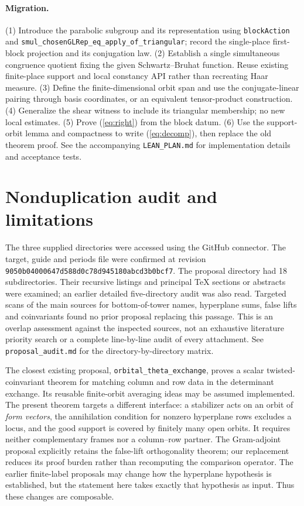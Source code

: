 \documentclass[11pt,letterpaper]{article}
\begin{document}
\paragraph{Migration.} (1) Introduce the parabolic subgroup and its representation using \texttt{blockAction} and \texttt{smul\_chosenGLRep\_eq\_apply\_of\_triangular}; record the single-place first-block projection and its conjugation law. (2) Establish a single simultaneous congruence quotient fixing the given Schwartz--Bruhat function. Reuse existing finite-place support and local constancy API rather than recreating Haar measure. (3) Define the finite-dimensional orbit span and use the conjugate-linear pairing through basis coordinates, or an equivalent tensor-product construction. (4) Generalize the shear witness to include its triangular membership; no new local estimates. (5) Prove (\ref{eq:right}) from the block datum. (6) Use the support-orbit lemma and compactness to write (\ref{eq:decomp}), then replace the old theorem proof. See the accompanying \texttt{LEAN\_PLAN.md} for implementation details and acceptance tests.

\section{Nonduplication audit and limitations}
The three supplied directories were accessed using the GitHub connector. The target, guide and periods file were confirmed at revision \texttt{9050b04000647d588d0c78d945180abcd3b0bcf7}. The proposal directory had 18 subdirectories. Their recursive listings and principal TeX sections or abstracts were examined; an earlier detailed five-directory audit was also read. Targeted scans of the main sources for bottom-of-tower names, hyperplane sums, false lifts and coinvariants found no prior proposal replacing this passage. This is an overlap assessment against the inspected sources, not an exhaustive literature priority search or a complete line-by-line audit of every attachment. See \texttt{proposal\_audit.md} for the directory-by-directory matrix.

The closest existing proposal, \texttt{orbital\_theta\_exchange}, proves a scalar twisted-coinvariant theorem for matching column and row data in the determinant exchange. Its reusable finite-orbit averaging ideas may be assumed implemented. The present theorem targets a different interface: a stabilizer acts on an orbit of \emph{form vectors}, the annihilation condition for nonzero hyperplane rows excludes a locus, and the good support is covered by finitely many open orbits. It requires neither complementary frames nor a column--row partner. The Gram-adjoint proposal explicitly retains the false-lift orthogonality theorem; our replacement reduces its proof burden rather than recomputing the comparison operator. The earlier finite-label proposals may change how the hyperplane hypothesis is established, but the statement here takes exactly that hypothesis as input. Thus these changes are composable.
\end{document}
